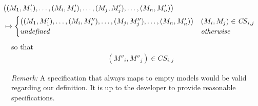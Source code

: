 \begin{definition}
\begin{align*}
    & \hspace{-3.1em} \big( (M_1, M'_1), \ldots, (M_i, M'_i), \ldots, (M_j, M'_j), \ldots, (M_n, M'_n) \big) \\
    & \hspace{-3.1em} \mapsto \begin{cases}
        \big( (M_1, M'_1), \ldots, (M_i, M''_i), \ldots, (M_j, M''_j), \ldots, (M_n, M'_n) \big) & (M_i, M_j) \in \mathit{CS}_{i,j} \\
        \mathit{undefined} & \mathit{otherwise}
    \end{cases}
\end{align*}
so that
\begin{align*}
    (M''_i, M''_j) \in \mathit{CS}_{i,j}
\end{align*}
\end{definition}

\noindent\textit{Remark:} %
A specification that always maps to empty models would be valid regarding our definition.
It is up to the developer to provide reasonable specifications. 




